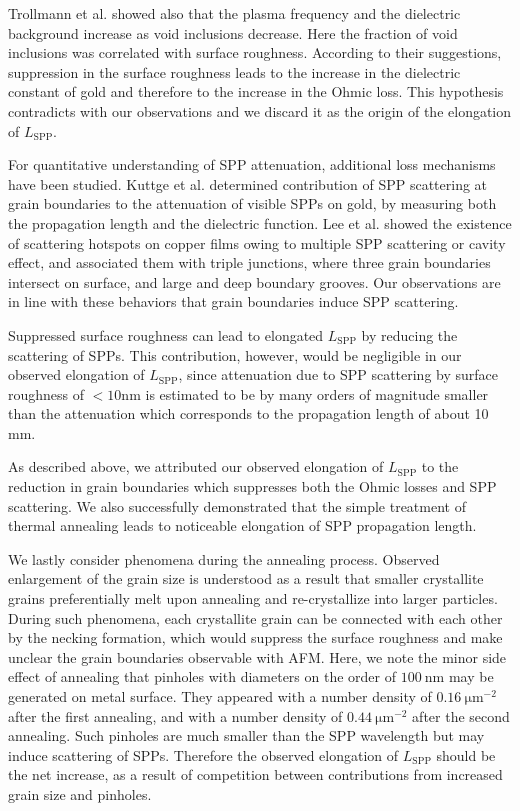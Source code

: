 \documentclass[aip,apl,reprint]{revtex4-1}
\begin{document}
Trollmann et al. showed also that the plasma frequency and the dielectric background increase as void inclusions decrease. Here the fraction of void inclusions was correlated with surface roughness. According to their suggestions, suppression in the surface roughness leads to the increase in the dielectric constant of gold and therefore to the increase in the Ohmic loss. This hypothesis contradicts with our observations and we discard it as the origin of the elongation of $L_{\mathrm{SPP}}$. 

For quantitative understanding of SPP attenuation, additional loss mechanisms have been studied. 
Kuttge et al.\cite{Kuttge} determined contribution of SPP scattering at grain boundaries to the attenuation of visible SPPs on gold, by measuring both the propagation length and the dielectric function. 
Lee et al.\cite{Lee} showed the existence of scattering hotspots on copper films owing to multiple SPP scattering or cavity effect, and associated them with triple junctions, where three grain boundaries intersect on surface, and large and deep boundary grooves. Our observations are in line with these behaviors that grain boundaries induce SPP scattering.
 
Suppressed surface roughness can lead to elongated $L_{\mathrm{SPP}}$ by reducing the scattering of SPPs. This contribution, however, would be negligible in our observed elongation of $L_{\mathrm{SPP}}$, since attenuation due to SPP scattering by surface roughness of $<10 \mathrm{nm}$ is estimated to be by many orders of magnitude smaller than the attenuation which corresponds to the propagation length of about 10 mm\cite{Shiba, Kuttge, Mills}.

As described above, we attributed our observed elongation of $L_{\mathrm{SPP}}$ to the reduction in grain boundaries which suppresses both the Ohmic losses and SPP scattering. We also successfully demonstrated that the simple treatment of thermal annealing leads to noticeable elongation of SPP propagation length. 

We lastly consider phenomena during the annealing process.
Observed enlargement of the grain size is understood as a result that smaller crystallite grains preferentially melt upon annealing\cite{Buffat} and re-crystallize into larger particles. 
During such phenomena, each crystallite grain can be connected with each other by the necking formation, which would suppress the surface roughness and make unclear the grain boundaries observable with AFM. Here, we note the minor side effect of annealing that pinholes with diameters on the order of $100\:\mathrm{nm}$ may be generated on metal surface. They appeared with a number density of $0.16\:\mathrm{\mu m}^{-2}$ after the first annealing, and with a number density of $0.44\:\mathrm{\mu m}^{-2}$ after the second annealing. Such pinholes are much smaller than the SPP wavelength but may induce scattering of SPPs. Therefore the observed elongation of $L_{\mathrm{SPP}}$ should be the net increase, as a result of competition between contributions from increased grain size and pinholes.
	
\end{document}
